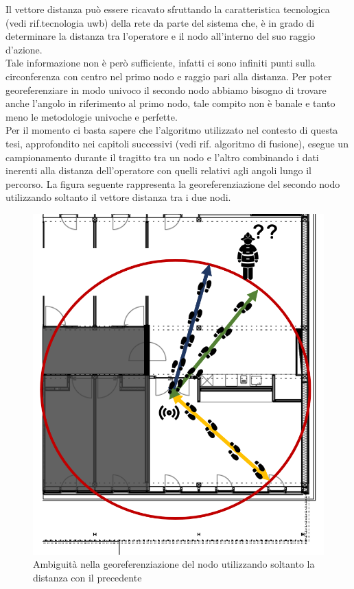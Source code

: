 Il vettore distanza può essere ricavato sfruttando la caratteristica tecnologica (vedi rif.tecnologia uwb) della rete da parte del sistema che, è in grado di determinare la distanza tra l'operatore e il nodo all'interno del suo raggio d'azione.\\
Tale informazione non è però sufficiente, infatti ci sono infiniti punti sulla circonferenza con centro nel primo nodo e raggio pari alla distanza. Per poter georeferenziare in modo univoco il secondo nodo abbiamo bisogno di trovare anche l'angolo in riferimento al primo nodo, tale compito non è banale e tanto meno le metodologie univoche e perfette.\\
Per il momento ci basta sapere che l'algoritmo utilizzato nel contesto di questa tesi, approfondito nei capitoli successivi (vedi rif. algoritmo di fusione), esegue un campionamento durante il tragitto tra un nodo e l'altro combinando i dati inerenti alla distanza dell'operatore con quelli relativi agli angoli lungo il percorso.
La figura seguente rappresenta la georeferenziazione del secondo nodo utilizzando soltanto il vettore distanza tra i due nodi.
\begin{figure}[H]
	\centering
	\includegraphics[scale=0.5]{DescrizioneDelSistema/ambiguitDistanza.png}
	\caption{Ambiguità nella georeferenziazione del nodo utilizzando soltanto la distanza con il precedente }
	\label{fig:ambiguitDistanz}
\end{figure}

